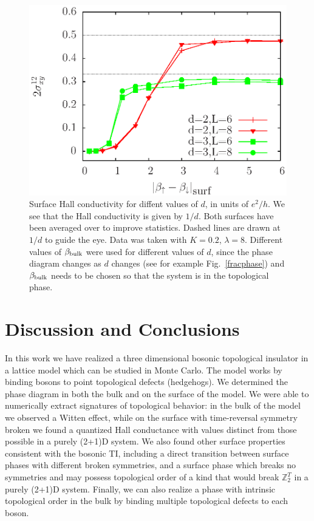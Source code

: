 \documentclass[prb,twocolumn]{revtex4-1}
\def\ztwot{\mathbb{Z}_2^T}
\begin{document}
\begin{figure}
\includegraphics[width=\linewidth]{figures/halldiff.eps}
\caption{Surface Hall conductivity for diffent values of $d$, in units of $e^2/h$. We see that the Hall conductivity is given by $1/d$. Both surfaces have been averaged over to improve statistics. Dashed lines are drawn at $1/d$ to guide the eye. Data was taken with $K=0.2$, $\lambda=8$. Different values of $\beta_{\rm bulk}$ were used for different values of $d$, since the phase diagram changes as $d$ changes (see for example Fig.~\ref{fracphase}) and $\beta_{\rm bulk}$ needs to be chosen so that the system is in the topological phase.
}
\label{halldiff}
\end{figure}


\section{Discussion and Conclusions}
In this work we have realized a three dimensional bosonic topological insulator in a lattice model which can be studied in Monte Carlo. The model works by binding bosons to point topological defects (hedgehogs). We determined the phase diagram in both the bulk and on the surface of the model. We were able to numerically extract signatures of topological behavior: in the bulk of the model we observed a Witten effect, while on the surface with time-reversal symmetry broken we found a quantized Hall conductance with values distinct from those possible in a purely (2+1)D system. We also found other surface properties consistent with the bosonic TI, including a direct transition between surface phases with different broken symmetries, and a surface phase which breaks no symmetries and may possess topological order of a kind that would break $\ztwot$ in a purely (2+1)D system. Finally, we can also realize a phase with intrinsic topological order in the bulk by binding multiple topological defects to each boson.
\end{document}
